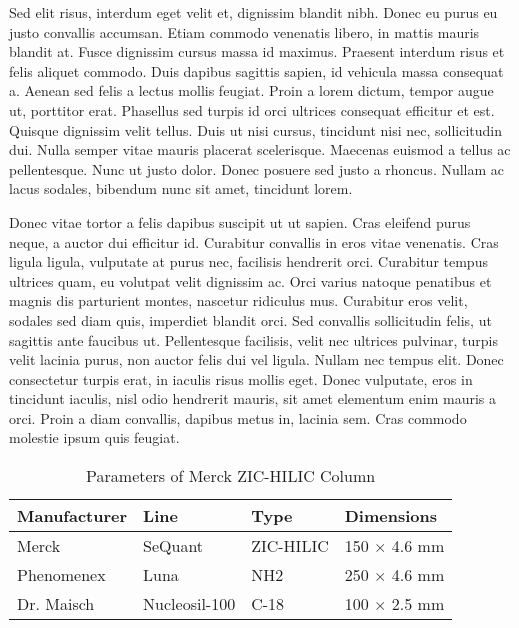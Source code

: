 Sed elit risus, interdum eget velit et, dignissim blandit nibh. Donec eu purus eu justo convallis accumsan. Etiam commodo venenatis libero, in mattis mauris blandit at. Fusce dignissim cursus massa id maximus. Praesent interdum risus et felis aliquet commodo. Duis dapibus sagittis sapien, id vehicula massa consequat a. Aenean sed felis a lectus mollis feugiat. Proin a lorem dictum, tempor augue ut, porttitor erat. Phasellus sed turpis id orci ultrices consequat efficitur et est. Quisque dignissim velit tellus. Duis ut nisi cursus, tincidunt nisi nec, sollicitudin dui. Nulla semper vitae mauris placerat scelerisque. Maecenas euismod a tellus ac pellentesque. Nunc ut justo dolor. Donec posuere sed justo a rhoncus. Nullam ac lacus sodales, bibendum nunc sit amet, tincidunt lorem.

Donec vitae tortor a felis dapibus suscipit ut ut sapien. Cras eleifend purus neque, a auctor dui efficitur id. Curabitur convallis in eros vitae venenatis. Cras ligula ligula, vulputate at purus nec, facilisis hendrerit orci. Curabitur tempus ultrices quam, eu volutpat velit dignissim ac. Orci varius natoque penatibus et magnis dis parturient montes, nascetur ridiculus mus. Curabitur eros velit, sodales sed diam quis, imperdiet blandit orci. Sed convallis sollicitudin felis, ut sagittis ante faucibus ut. Pellentesque facilisis, velit nec ultrices pulvinar, turpis velit lacinia purus, non auctor felis dui vel ligula. Nullam nec tempus elit. Donec consectetur turpis erat, in iaculis risus mollis eget. Donec vulputate, eros in tincidunt iaculis, nisl odio hendrerit mauris, sit amet elementum enim mauris a orci. Proin a diam convallis, dapibus metus in, lacinia sem. Cras commodo molestie ipsum quis feugiat.

\begin{table}[h]
	\caption{Parameters of Merck ZIC-HILIC Column}
	\label{tab:HILIC-specs}
	\centering

	\begin{tabularx}{\textwidth}{XXXX}
		Manufacturer & Line & Type & Dimensions\\
		\hline
		Merck & SeQuant\textregistered & ZIC-HILIC & 150 $\times$ 4.6 mm\\
		Phenomenex & Luna\textregistered & NH2 & 250 $\times$ 4.6 mm\\
		Dr. Maisch & Nucleosil-100 & C-18 & 100 $\times$ 2.5 mm\\
		\hline
	\end{tabularx}
\end{table}

